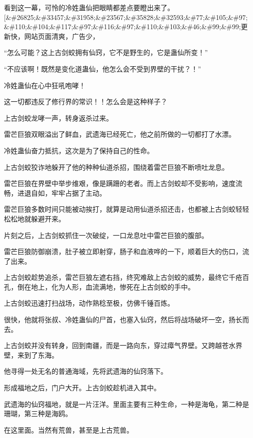 
\begin{this_body}

看到这一幕，可怜的冷姓蛊仙把眼睛都差点要瞪出来了。[\&\#26825;\&\#33457;\&\#31958;\&\#23567;\&\#35828;\&\#32593;\&\#77;\&\#105;\&\#97;\&\#110;\&\#104;\&\#117;\&\#97;\&\#116;\&\#97;\&\#110;\&\#103;\&\#46;\&\#99;\&\#99;更新快，网站页面清爽，广告少，

“怎么可能？这上古剑蛟拥有仙窍，它不是野生的，它是蛊仙所变！”

“不应该啊！既然是变化道蛊仙，他怎么会不受到界壁的干扰？！”

冷姓蛊仙在心中狂吼咆哮！

这一切都违反了修行界的常识！！怎么会是这种样子？

上古剑蛟龙哮一声，转身返杀过来。

雷芒巨狼双眼溢出了鲜血，武遗海已经死亡，他之前所做的一切都打了水漂。

冷姓蛊仙奋力抵抗，这次是为了保持自己的性命。

上古剑蛟狡诈地躲开了他的种种仙道杀招，围绕着雷芒巨狼不断喷吐龙息。

雷芒巨狼在界壁中举步维艰，像是蹒跚的老者。而上古剑蛟却不受影响，速度流畅，进退自如，牢牢占据了主动。

雷芒巨狼多数时间只能被动挨打，就算是动用仙道杀招还击，也都被上古剑蛟轻轻松松地就躲避开来。

片刻之后，上古剑蛟抓住一次破绽，一口龙息吐中雷芒巨狼的腹部。

雷芒巨狼防御崩溃，肚子被立即射穿，肠子和血液哗的一下，顺着巨大的伤口，流了出来。

上古剑蛟趁势追杀，雷芒巨狼左遮右挡，终究难敌上古剑蛟的威势，最终它千疮百孔，倒在地上，化为人形，血流满地，惨死在上古剑蛟的手中。

上古剑蛟迅速打扫战场，动作熟稔至极，仿佛千锤百炼。

很快，他就将张叔、冷姓蛊仙的尸首，也塞入仙窍，然后将战场破坏一空，扬长而去。

上古剑蛟并没有转身，回到南疆，而是一路向东，穿过瘴气界壁。又跨越苍水界壁，来到了东海。

他寻得一处无名的普通海域，先将武遗海的仙窍落下。

形成福地之后，门户大开。上古剑蛟趁机进入其中。

武遗海的仙窍福地，就是一片汪洋。里面主要有三种生命，一种是海龟，第二种是珊瑚，第三种是海鸥。

在这里面。当然有荒兽，甚至是上古荒兽。


\end{this_body}
